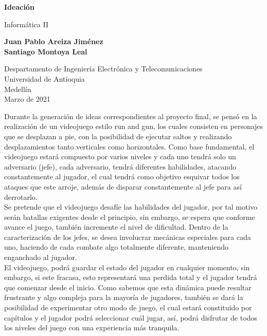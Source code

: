 \documentclass{article}
\begin{document}
\begin{titlepage}
    \begin{center}
        \vspace*{1cm}
            
        \Huge
        \textbf{Ideación}
            
        \vspace{0.5cm}
        \LARGE
        Informática II
            
        \vspace{1.5cm}
            
        \textbf{Juan Pablo Areiza Jiménez\\Santiago Montoya Leal}
            
        \vfill
            
        \vspace{0.8cm}
            
        \Large
        Despartamento de Ingeniería Electrónica y Telecomunicaciones\\
        Universidad de Antioquia\\
        Medellín\\
        Marzo de 2021
            
    \end{center}
\end{titlepage}
Durante la generación de ideas correspondientes al proyecto final, se pensó en la realización de un videojuego estilo run and gun, los cuales consisten en personajes que se desplazan a pie, con la posibilidad de ejecutar saltos y realizando desplazamientos tanto verticales como horizontales. Como base fundamental, el videojuego estará compuesto por varios niveles y cada uno tendrá solo un adversario (jefe), cada adversario, tendrá diferentes habilidades, atacando constantemente al jugador, el cual tendrá como objetivo esquivar todos los ataques que este arroje, además de disparar constantemente al jefe para así derrotarlo. \\

Se pretende que el videojuego desafíe las habilidades del jugador, por tal motivo serán batallas exigentes desde el principio, sin embargo, se espera que conforme avance el juego, también incremente el nivel de dificultad. Dentro de la caracterización de los jefes, se desea involucrar mecánicas especiales para cada uno, haciendo de cada combate algo totalmente diferente, manteniendo enganchado al jugador.\\

El videojuego, podrá guardar el estado del jugador en cualquier momento, sin embargo, si este fracasa, esto representará una perdida total y el jugador tendrá que comenzar desde el inicio. Como sabemos que esta dinámica puede resultar frustrante y algo compleja para la mayoría de jugadores, también se dará la posibilidad de experimentar otro modo de juego, el cual estará constituido por capítulos y el jugador podrá seleccionar cuál jugar, así, podrá disfrutar de todos los niveles del juego con una experiencia más tranquila.

\newpage
\end{document}
